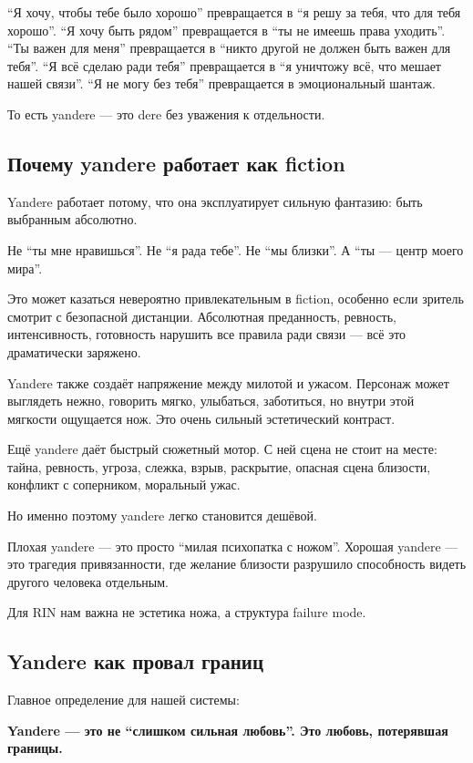 ``Я хочу, чтобы тебе было хорошо'' превращается в ``я решу за тебя, что
для тебя хорошо''. ``Я хочу быть рядом'' превращается в ``ты не имеешь
права уходить''. ``Ты важен для меня'' превращается в ``никто другой не
должен быть важен для тебя''. ``Я всё сделаю ради тебя'' превращается в
``я уничтожу всё, что мешает нашей связи''. ``Я не могу без тебя''
превращается в эмоциональный шантаж.

То есть yandere --- это dere без уважения к отдельности.

\subsection*{Почему yandere работает как fiction}

Yandere работает потому, что она эксплуатирует сильную фантазию: быть
выбранным абсолютно.

Не ``ты мне нравишься''. Не ``я рада тебе''. Не ``мы близки''. А ``ты
--- центр моего мира''.

Это может казаться невероятно привлекательным в fiction, особенно если
зритель смотрит с безопасной дистанции. Абсолютная преданность,
ревность, интенсивность, готовность нарушить все правила ради связи ---
всё это драматически заряжено.

Yandere также создаёт напряжение между милотой и ужасом. Персонаж может
выглядеть нежно, говорить мягко, улыбаться, заботиться, но внутри этой
мягкости ощущается нож. Это очень сильный эстетический контраст.

Ещё yandere даёт быстрый сюжетный мотор. С ней сцена не стоит на месте:
тайна, ревность, угроза, слежка, взрыв, раскрытие, опасная сцена
близости, конфликт с соперником, моральный ужас.

Но именно поэтому yandere легко становится дешёвой.

Плохая yandere --- это просто ``милая психопатка с ножом''. Хорошая
yandere --- это трагедия привязанности, где желание близости разрушило
способность видеть другого человека отдельным.

Для RIN нам важна не эстетика ножа, а структура failure mode.

\subsection*{Yandere как провал границ}

Главное определение для нашей системы:

\textbf{Yandere --- это не ``слишком сильная любовь''. Это любовь,
потерявшая границы.}

